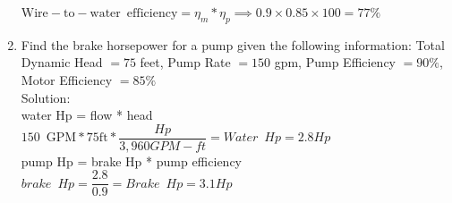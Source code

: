 \documentclass{article}
\begin{document}
\begin{enumerate}
 \vspace{0.2cm}
$\mathrm{Wire-to-water} \enspace \mathrm{efficiency}=\eta_m * \eta_p \implies 0.9 \times 0.85 \times 100=\boxed{77 \%}$

  \item Find the brake horsepower for a pump given the following information: Total Dynamic Head $=75$ feet, Pump Rate $=150$ gpm, Pump Efficiency $=90 \%$, Motor Efficiency $=85 \%$\\
  
  Solution:\\
\vspace{0.4cm}
water Hp = flow * head\\
$150 \enspace \mathrm{GPM}*75\mathrm{ft}*\dfrac{Hp}{3,960 GPM-ft}=\boxed{Water \enspace Hp = 2.8Hp}$\\
\vspace{0.4cm}
pump Hp = brake Hp * pump efficiency\\
$brake \enspace Hp = \dfrac{2.8}{0.9}=\boxed{Brake \enspace Hp=3.1Hp}$
 \vspace{0.2cm}


\end{enumerate}
\end{document}
